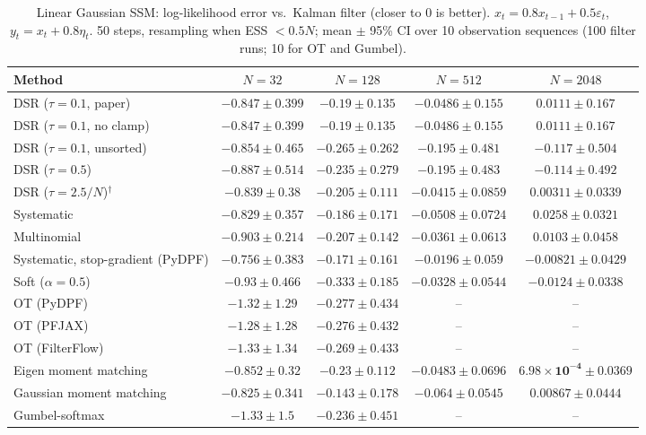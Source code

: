 \begin{table}[H]
\centering
\small
\caption{Linear Gaussian SSM: log-likelihood error vs.\ Kalman filter (closer to 0 is better). $x_t=0.8x_{t-1}+0.5\varepsilon_t$, $y_t=x_t+0.8\eta_t$. 50 steps, resampling when ESS $<0.5N$; mean $\pm$ 95\% CI over 10 observation sequences (100 filter runs; 10 for OT and Gumbel).}
\label{tab:linear-loglik_error}
\begin{adjustbox}{max width=\linewidth}
\begin{tabular}{lcccc}
\toprule
Method & $N{=}32$ & $N{=}128$ & $N{=}512$ & $N{=}2048$ \\
\midrule
DSR ($\tau{=}0.1$, paper) & $-0.847\pm0.399$ & $-0.19\pm0.135$ & $-0.0486\pm0.155$ & $0.0111\pm0.167$ \\
DSR ($\tau{=}0.1$, no clamp) & $-0.847\pm0.399$ & $-0.19\pm0.135$ & $-0.0486\pm0.155$ & $0.0111\pm0.167$ \\
DSR ($\tau{=}0.1$, unsorted) & $-0.854\pm0.465$ & $-0.265\pm0.262$ & $-0.195\pm0.481$ & $-0.117\pm0.504$ \\
DSR ($\tau{=}0.5$) & $-0.887\pm0.514$ & $-0.235\pm0.279$ & $-0.195\pm0.483$ & $-0.114\pm0.492$ \\
DSR ($\tau{=}2.5/N$)$^\dagger$ & $-0.839\pm0.38$ & $-0.205\pm0.111$ & $-0.0415\pm0.0859$ & $0.00311\pm0.0339$ \\
\midrule
Systematic & $-0.829\pm0.357$ & $-0.186\pm0.171$ & $-0.0508\pm0.0724$ & $0.0258\pm0.0321$ \\
Multinomial & $-0.903\pm0.214$ & $-0.207\pm0.142$ & $-0.0361\pm0.0613$ & $0.0103\pm0.0458$ \\
Systematic, stop-gradient (PyDPF) & $\mathbf{-0.756\pm0.383}$ & $-0.171\pm0.161$ & $\mathbf{-0.0196\pm0.059}$ & $-0.00821\pm0.0429$ \\
Soft ($\alpha{=}0.5$) & $-0.93\pm0.466$ & $-0.333\pm0.185$ & $-0.0328\pm0.0544$ & $-0.0124\pm0.0338$ \\
OT (PyDPF) & $-1.32\pm1.29$ & $-0.277\pm0.434$ & -- & -- \\
OT (PFJAX) & $-1.28\pm1.28$ & $-0.276\pm0.432$ & -- & -- \\
OT (FilterFlow) & $-1.33\pm1.34$ & $-0.269\pm0.433$ & -- & -- \\
Eigen moment matching & $-0.852\pm0.32$ & $-0.23\pm0.112$ & $-0.0483\pm0.0696$ & $\mathbf{6.98\times10^{-4}\pm0.0369}$ \\
Gaussian moment matching & $-0.825\pm0.341$ & $\mathbf{-0.143\pm0.178}$ & $-0.064\pm0.0545$ & $0.00867\pm0.0444$ \\
Gumbel-softmax & $-1.33\pm1.5$ & $-0.236\pm0.451$ & -- & -- \\

\end{tabular}
\end{adjustbox}
\end{table}
